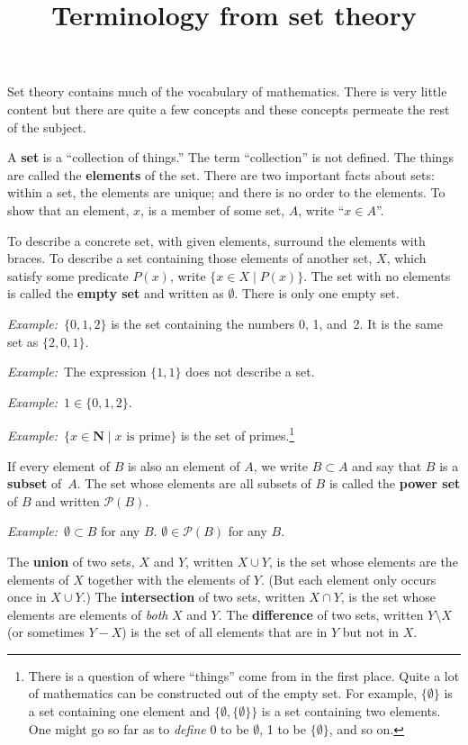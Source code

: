 \documentclass[10pt, a4paper, twocolumn]{article}
\title{Terminology from set theory}
\author{}\date{}
\newcommand{\defn}[1]{\textbf{\textsf{#1}}}
\newcommand{\eg}{\emph{Example:}\relax}
\newcommand{\set}[1]{\mathbold{#1}}
\begin{document}
\maketitle
Set theory contains much of the vocabulary of mathematics. There is very little
content but there are quite a few concepts and these concepts permeate the rest
of the subject.

A \defn{set} is a “collection of things.” The term “collection” is not
defined. The things are called the \defn{elements} of the set. There are two
important facts about sets: within a set, the elements are unique; and there is
no order to the elements. To show that an element, $x$, is a member of some set,
$A$, write “$x \in A$”.

To describe a concrete set, with given elements, surround the elements with
braces. To describe a set containing those elements of another set, $X$, which
satisfy some predicate $P(x)$, write $\{x \in X \mid P(x)\}$. The set with no
elements is called the \defn{empty set} and written as $\emptyset$. There is only one
empty set.

\eg\ $\{0, 1, 2\}$ is the set containing the numbers 0, 1, and~2. It is the same
set as $\{2,0,1\}$.

\eg\ The expression $\{1, 1\}$ does not describe a set.

\eg\ $1\in\{0,1,2\}$.

\eg\ $\{x \in \set{N} \mid \text{$x$ is prime}\}$ is the set of
primes.\footnote{There is a question of where “things” come from in
the first place. Quite a lot of mathematics can be constructed out of
the empty set. For example, $\{\emptyset\}$ is a set containing one element
and $\{\emptyset, \{\emptyset\}\}$ is a set containing two elements. One might go so
far as to \emph{define} 0 to be $\emptyset$, 1 to be $\{\emptyset\}$, and so on.}

If every element of $B$ is also an element of $A$, we write $B \subset A$
and say that $B$ is a \defn{subset} of~$A$. The set whose elements are
all subsets of $B$ is called the \defn{power set} of $B$ and written
$\mathcal{P}(B)$.

\eg\ $\emptyset \subset B$ for any $B$. $\emptyset \in \mathcal{P}(B)$ for any $B$.

The \defn{union} of two sets, $X$ and $Y$, written $X \cup Y$, is the set
whose elements are the elements of $X$ together with the elements of
$Y$. (But each element only occurs once in $X \cup Y$.) The
\defn{intersection} of two sets, written $X \cap Y$, is the set whose
elements are elements of \emph{both} $X$ and $Y$. The
\defn{difference} of two sets, written $Y \setminus X$ (or sometimes $Y-X$) is
the set of all elements that are in $Y$ but not in $X$.
\end{document}
